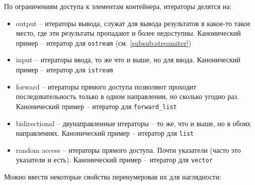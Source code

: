 \documentclass[a4paper,12pt,oneside]{article}
\begin{document}
По ограничениям доступа к элементам контейнера, итераторы делятся на:

\begin {itemize}
\item output -- итераторы вывода, служат для вывода результатов в какое-то такое место, где эти результаты пропадают и более недоступны. Канонический пример -- итератор для \lstinline!ostream! (см. \ref{subsub:streamiter})
\item input -- итераторы ввода, то же что и выше, но для ввода. Канонический пример -- итератор для \lstinline!istream!
\item forward -- итераторы прямого доступа позволяют проходит последовательность только в одном направлении, но сколько угодно раз. Канонический пример -- итератор для \lstinline!forward_list!
\item bidirectional -- двунаправленные итераторы -- то же, что и выше, но в обоих направлениях. Канонический пример -- итератор для \lstinline!list!
\item random access -- итераторы прямого доступа. Почти указатели (часто это указатели и есть). Канонический пример -- итератор для \lstinline!vector!
\end {itemize}

Можно ввести некоторые свойства перенумеровав их для наглядности:
\end{document}
